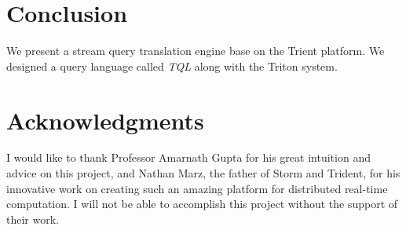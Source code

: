 \documentclass[conference, twocolumn, 11pt]{IEEEtran}
\theoremstyle{definition}
\begin{document}
\section{Conclusion}
We present a stream query translation engine base on the Trient platform. We designed a query language called \emph{TQL} along with the Triton system.


\section*{Acknowledgments}
I would like to thank Professor Amarnath Gupta for his great intuition and advice on this project,
and Nathan Marz, the father of Storm and Trident, for his innovative work on creating such an amazing platform for distributed real-time computation.
I will not be able to accomplish this project without the support of their work.


\end{document}
